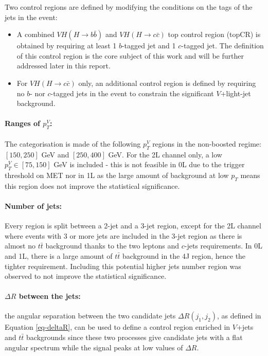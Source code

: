 Two control regions are defined by modifying the conditions on the tags of the jets in the event: 
\begin{itemize}
\item A combined $VH(H\rightarrow b\bar{b})$ and $VH(H\rightarrow c\bar{c})$ top control region (topCR) is obtained by requiring at least 1 $b$-tagged jet and 1 $c$-tagged jet. The definition of this control region is the core subject of this work and will be further addressed later in this report. 
\item For $VH(H\rightarrow c\bar{c})$ only, an additional control region is defined by requiring no $b$- nor $c$-tagged jets in the event to constrain the significant $V$+light-jet background. 
\end{itemize}

\paragraph{Ranges of $p_T^V$:} The categorisation is made of the following $p_T^V$ regions in the non-boosted regime:  $[150, 250]$ GeV and $[250, 400]$ GeV. For the 2L channel only, a low $p_T^V \in [75, 150]$ GeV is included - this is not feasible in 0L due to the trigger threshold on MET nor in 1L as the large amount of background at low $p_T$ means this region does not improve the statistical significance.

\paragraph{Number of jets:} Every region is split between a 2-jet and a 3-jet region, except for the 2L channel where events with 3 or more jets are included in the 3-jet region as there is almost no $t\bar{t}$ background thanks to the two leptons and $c$-jets requirements. In 0L and 1L, there is a large amount of $t\bar{t}$ background in the 4J region, hence the tighter requirement. Including this potential higher jets number region was observed to not improve the statistical significance. 

\paragraph{$\Delta R$ between the jets:} the angular separation between the two candidate jets $\Delta R(j_1, j_2)$, as defined in Equation \ref{eq-deltaR}, can be used to define a control region enriched in $V$+jets and $t\bar{t}$ backgrounds since these two processes give candidate jets with a flat angular spectrum while the signal peaks at low values of $\Delta R$. 

